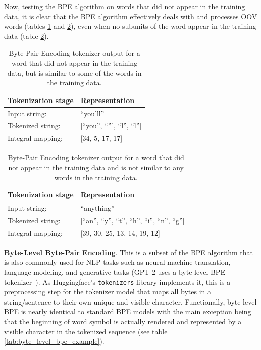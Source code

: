\documentclass[12pt]{article}
\begin{document}
\noindent
Now, testing the BPE algorithm on words that did not appear in the training data, it is clear that the BPE algorithm effectively deals with and
processes OOV words (tables \ref{tab:bpe_unk_similar} and \ref{tab:bpe_unk}), even when no subunits of the word appear in the training data (table
\ref{tab:bpe_unk}).

\begin{table}[h!]
    \centering
    \begin{tabular}{l l}
        \toprule
        Tokenization stage & Representation                 \\
        \midrule
        Input string:      & ``you'll''                     \\
        Tokenized string:  & [``you'', ``''', ``l'', ``l''] \\
        Integral mapping:  & [34, 5, 17, 17]                \\
        \bottomrule
    \end{tabular}
    \caption{Byte-Pair Encoding tokenizer output for a word that did not appear in the training data, but is similar to some of the words in the
        training data.}
    \label{tab:bpe_unk_similar}
\end{table}

\begin{table}[h!]
    \centering
    \begin{tabular}{l l}
        \toprule
        Tokenization stage & Representation                                     \\
        \midrule
        Input string:      & ``anything''                                       \\
        Tokenized string:  & [``an'', ``y'', ``t'', ``h'', ``i'', ``n'', ``g''] \\
        Integral mapping:  & [39, 30, 25, 13, 14, 19, 12]                       \\
        \bottomrule
    \end{tabular}
    \caption{Byte-Pair Encoding tokenizer output for a word that did not appear in the training data and is not similar to any words in the training
        data.}
    \label{tab:bpe_unk}
\end{table}

\textbf{Byte-Level Byte-Pair Encoding}. This is a subset of the BPE algorithm that is also commonly used for NLP tasks such as neural machine
translation, language modeling, and generative tasks (GPT-2 uses a byte-level BPE tokenizer~\cite{radford_language_2019}). As Huggingface's
\lstinline|tokenizers| library implements it, this is a preprocessing step for the tokenizer model that maps all bytes in a string/sentence to their
own unique and visible character. Functionally, byte-level BPE is nearly identical to standard BPE models with the main exception being that the
beginning of word symbol is actually rendered and represented by a visible character in the tokenized sequence (see table
\ref{tab:byte_level_bpe_example}).
\end{document}
